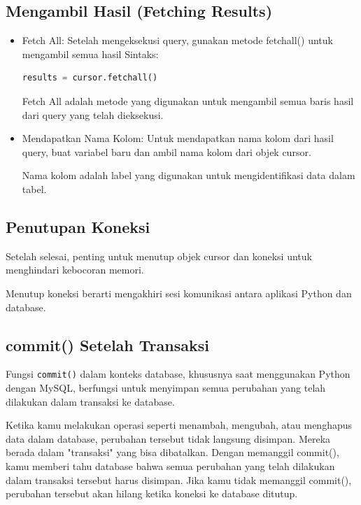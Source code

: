 \documentclass{article}
\begin{document}
\subsection{Mengambil Hasil (Fetching Results)}
\begin{itemize}
      \item Fetch All: Setelah mengeksekusi query, gunakan metode fetchall() untuk mengambil semua hasil
            Sintaks:
            \begin{lstlisting}[language=Python, caption={}, captionpos=b]
results = cursor.fetchall()
\end{lstlisting}

            Fetch All adalah metode yang digunakan untuk mengambil semua baris hasil dari query yang telah dieksekusi.
      \item Mendapatkan Nama Kolom: Untuk mendapatkan nama kolom dari hasil query, buat variabel baru dan ambil nama kolom dari objek cursor.

            Nama kolom adalah label yang digunakan untuk mengidentifikasi data dalam tabel.
\end{itemize}

\subsection{Penutupan Koneksi}
Setelah selesai, penting untuk menutup objek cursor dan koneksi untuk menghindari kebocoran memori.

Menutup koneksi berarti mengakhiri sesi komunikasi antara aplikasi Python dan database.

\subsection{commit() Setelah Transaksi}
Fungsi \verb|commit()| dalam konteks database, khususnya saat menggunakan Python dengan MySQL, berfungsi untuk menyimpan semua perubahan yang telah dilakukan dalam transaksi ke database.

Ketika kamu melakukan operasi seperti menambah, mengubah, atau menghapus data dalam database, perubahan tersebut tidak langsung disimpan. Mereka berada dalam "transaksi" yang bisa dibatalkan. Dengan memanggil commit(), kamu memberi tahu database bahwa semua perubahan yang telah dilakukan dalam transaksi tersebut harus disimpan. Jika kamu tidak memanggil commit(), perubahan tersebut akan hilang ketika koneksi ke database ditutup.
\end{document}
